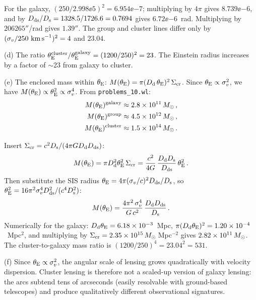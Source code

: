 \begin{derivation}
For the galaxy, $(250/2.998\ee{5})^2 = 6.954\ee{-7}$; multiplying by
$4\pi$ gives $8.739\ee{-6}$, and by $D_{\mathrm{ds}}/D_{\mathrm{s}} = 1328.5/1726.6 = 0.7694$ gives
$6.72\ee{-6}$~rad.  Multiplying by $206265''$/rad gives $1.39''$.  The group
and cluster lines differ only by $(\sigma_v/250~\text{km\,s}^{-1})^2 =
4$ and $23.04$.
\end{derivation}

(d) The ratio $\theta_{\mathrm{E}}^{\text{cluster}}/\theta_{\mathrm{E}}^{\text{galaxy}}
= (1200/250)^2 = 23$.  The Einstein radius increases by a factor of
$\sim$23 from galaxy to cluster.

(e) The enclosed mass within $\theta_{\mathrm{E}}$:
$M(\theta_{\mathrm{E}}) = \pi(D_{\mathrm{d}}\,\theta_{\mathrm{E}})^2\,\Sigma_{\mathrm{cr}}$.  Since
$\theta_{\mathrm{E}} \propto \sigma_v^2$, we have
$M(\theta_{\mathrm{E}}) \propto \theta_{\mathrm{E}}^2 \propto \sigma_v^4$.  From
\texttt{problems\_10.wl}:
\begin{align*}
    M(\theta_{\mathrm{E}})^{\text{galaxy}} &\approx 2.8\times 10^{11}\,M_{\odot} \,, \\
    M(\theta_{\mathrm{E}})^{\text{group}} &\approx 4.5\times 10^{12}\,M_{\odot} \,, \\
    M(\theta_{\mathrm{E}})^{\text{cluster}} &\approx 1.5\times 10^{14}\,M_{\odot} \,.
\end{align*}

\begin{derivation}
Insert $\Sigma_{\mathrm{cr}} = c^2D_{\mathrm{s}}/(4\pi GD_{\mathrm{d}}D_{\mathrm{ds}})$:
\begin{equation*}
    M(\theta_{\mathrm{E}}) = \pi D_{\mathrm{d}}^2\theta_{\mathrm{E}}^2\,\Sigma_{\mathrm{cr}}
    = \frac{c^2}{4G}\,\frac{D_{\mathrm{d}}D_{\mathrm{s}}}{D_{\mathrm{ds}}}\,\theta_{\mathrm{E}}^2\,.
\end{equation*}
Then substitute the SIS radius $\theta_{\mathrm{E}} = 4\pi(\sigma_v/c)^2
D_{\mathrm{ds}}/D_{\mathrm{s}}$, so $\theta_{\mathrm{E}}^2 = 16\pi^2\sigma_v^4D_{\mathrm{ds}}^2/(c^4D_{\mathrm{s}}^2)$:
\begin{equation*}
    M(\theta_{\mathrm{E}}) = \frac{4\pi^2\,\sigma_v^4}{G\,c^2}\,
    \frac{D_{\mathrm{d}}D_{\mathrm{ds}}}{D_{\mathrm{s}}}\,.
\end{equation*}
Numerically for the galaxy: $D_{\mathrm{d}}\theta_{\mathrm{E}} = 6.18\times 10^{-3}$~Mpc,
$\pi(D_{\mathrm{d}}\theta_{\mathrm{E}})^2 = 1.20\times 10^{-4}$~Mpc$^2$, and multiplying by
$\Sigma_{\mathrm{cr}} = 2.35\times 10^{15}\,M_{\odot}$\,Mpc$^{-2}$ gives $2.82\times 10^{11}\,M_{\odot}$.
The cluster-to-galaxy mass ratio is $(1200/250)^4 = 23.04^2 = 531$.
\end{derivation}

(f) Since $\theta_{\mathrm{E}} \propto \sigma_v^2$, the angular scale
of lensing grows quadratically with velocity dispersion.
Cluster lensing is therefore not a scaled-up version of galaxy
lensing: the arcs subtend tens of arcseconds (easily resolvable with
ground-based telescopes) and produce qualitatively different
observational signatures.  \checkmark


